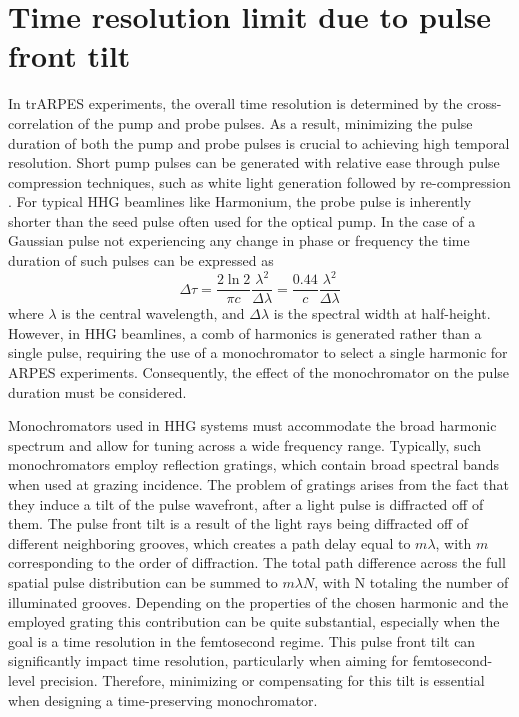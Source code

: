 \section{Time resolution limit due to pulse front tilt}

In trARPES experiments, the overall time resolution is determined by the cross-correlation of the pump and probe pulses.
As a result, minimizing the pulse duration of both the pump and probe pulses is crucial to achieving high temporal resolution.
Short pump pulses can be generated with relative ease through pulse compression techniques, such as white light generation followed by re-compression \cite{nisoli_compression_1997}. For typical HHG beamlines like Harmonium, the probe pulse is inherently shorter than the seed pulse often used for the optical pump.
In the case of a Gaussian pulse not experiencing any change in phase or frequency the time duration of such pulses can be expressed as
\begin{equation}
	\Delta\tau = \frac{2 \ln{2}}{\pi c}\frac{\lambda^2}{\Delta\lambda} = \frac{0.44}{c}\frac{\lambda^2}{\Delta\lambda}
\end{equation}
where $\lambda$ is the central wavelength, and $\Delta\lambda$ is the spectral width at half-height.
However, in HHG beamlines, a comb of harmonics is generated rather than a single pulse, requiring the use of a monochromator to select a single harmonic for ARPES experiments. Consequently, the effect of the monochromator on the pulse duration must be considered.

Monochromators used in HHG systems must accommodate the broad harmonic spectrum and allow for tuning across a wide frequency range.
Typically, such monochromators employ reflection gratings, which contain broad spectral bands when used at grazing incidence.
The problem of gratings arises from the fact that they induce a tilt of the pulse wavefront, after a light pulse is diffracted off of them.
The pulse front tilt is a result of the light rays being diffracted off of different neighboring grooves, which creates a path delay equal to $m\lambda$, with $m$ corresponding to the order of diffraction.
The total path difference across the full spatial pulse distribution can be summed to $m\lambda N$, with N totaling the number of illuminated grooves.
Depending on the properties of the chosen harmonic and the employed grating this contribution can be quite substantial, especially when the goal is a time resolution in the femtosecond regime.
This pulse front tilt can significantly impact time resolution, particularly when aiming for femtosecond-level precision.
Therefore, minimizing or compensating for this tilt is essential when designing a time-preserving monochromator.

